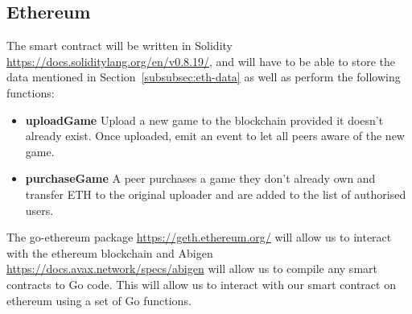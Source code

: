 \subsection*{Ethereum}

The smart contract will be written in Solidity \url{https://docs.soliditylang.org/en/v0.8.19/}, and will have to be able to store the data mentioned in Section~\ref{subsubsec:eth-data} as well as perform the following functions:

\begin{itemize}
  \item \textbf{uploadGame} Upload a new game to the blockchain provided it doesn't already exist. Once uploaded, emit an event to let all peers aware of the new game.
  \item \textbf{purchaseGame} A peer purchases a game they don't already own and transfer ETH to the original uploader and are added to the list of authorised users.
\end{itemize}

\vspace{2mm}\noindent
The go-ethereum package \url{https://geth.ethereum.org/} will allow us to interact with the ethereum blockchain and Abigen \url{https://docs.avax.network/specs/abigen} will allow us to compile any smart contracts to Go code. This will allow us to interact with our smart contract on ethereum using a set of Go functions.